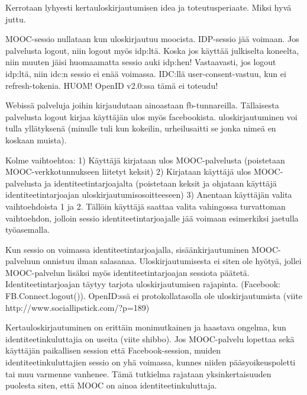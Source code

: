 \documentclass[finnish,gradu]{tktltiki}
\begin{document}
  Kerrotaan lyhyesti kertauloskirjautumisen idea ja toteutusperiaate. Miksi hyvä juttu.

  MOOC-sessio nullataan kun uloskirjautuu moocista. IDP-sessio jää voimaan. Jos palvelusta logout, niin logout myös idp:ltä. Koska jos käyttää julkiselta koneelta, niin muuten jäisi huomaamatta sessio auki idp:hen! Vastaavasti, jos logout idp:ltä, niin idc:n sessio ei enää voimassa. IDC:llä user-consent-vastuu, kun ei refresh-tokenia. HUOM! OpenID v2.0:ssa tämä ei toteudu!

  Webissä palveluja joihin kirjaudutaan ainoastaan fb-tunnareilla. Tällaisesta palvelusta logout kirjaa käyttäjän ulos myös facebookista. uloskirjautuminen voi tulla yllätyksenä (minulle tuli kun kokeilin, urheilusaitti se jonka nimeä en koskaan muista).

  Kolme vaihtoehtoa:
  1) Käyttäjä kirjataan ulos MOOC-palvelusta (poistetaan MOOC-verkkotunnukseen liitetyt keksit)
  2) Kirjataan käyttäjä ulos MOOC-palvelusta ja identiteetintarjoajalta (poistetaan keksit ja ohjataan käyttäjä identiteetintarjoajan uloskirjautumisosoitteeseen)
  3) Anentaan käyttäjän valita vaihtoehdoista 1 ja 2. Tällöin käyttäjä saattaa valita vahingossa turvattoman vaihtoehdon, jolloin sessio identiteetintarjoajalle jää voimaan esimerkiksi jaetulla työasemalla.

  Kun sessio on voimassa identiteetintarjoajalla, sisäänkirjautuminen MOOC-palveluun onnistuu ilman salasanaa. Uloskirjautumisesta ei siten ole hyötyä, jollei MOOC-palvelun lisäksi myös identiteetintarjoajan sessiota päätetä. Identiteetintarjoajan täytyy tarjota uloskirjautumisen rajapinta. (Facebook: FB.Connect.logout()). OpenID:ssä ei protokollatasolla ole uloskirjautumista (viite http://www.sociallipstick.com/?p=189)

  Kertauloskirjautuminen on erittäin monimutkainen ja haastava ongelma, kun identiteetinkuluttajia on useita (viite shibbo). Jos MOOC-palvelu lopettaa sekä käyttäjän paikallisen session että Facebook-session, muiden identiteetinkuluttajien sessio on yhä voimassa, kunnes niiden pääsyoikeuspoletti tai muu varmenne vanhenee. Tämä tutkielma rajataan yksinkertaisuuden puolesta siten, että MOOC on ainoa identiteetinkuluttaja.


\end{document}
